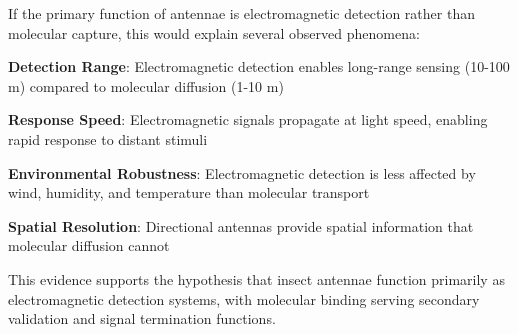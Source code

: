 \documentclass[
  13pt,
  a4paperpaper,
  12pt]{article}
\begin{document}
If the primary function of antennae is electromagnetic detection rather
than molecular capture, this would explain several observed phenomena:

\textbf{Detection Range}: Electromagnetic detection enables long-range
sensing (10-100 m) compared to molecular diffusion (1-10 m)

\textbf{Response Speed}: Electromagnetic signals propagate at light
speed, enabling rapid response to distant stimuli

\textbf{Environmental Robustness}: Electromagnetic detection is less
affected by wind, humidity, and temperature than molecular transport

\textbf{Spatial Resolution}: Directional antennas provide spatial
information that molecular diffusion cannot

This evidence supports the hypothesis that insect antennae function
primarily as electromagnetic detection systems, with molecular binding
serving secondary validation and signal termination functions.
\end{document}

